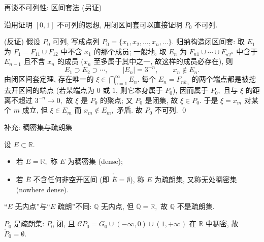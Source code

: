 \begin{frame}{再谈不可列性: 区间套法 (另证)}

沿用证明 $[0,1]$ 不可列的思想, 用\alert{闭区间套}可以直接证明 $P_0$ 不可列.

\pause

\startproof[bg=yellow, fg=red](反证)
假设 $P_0$ 可列, 写成点列 $P_0 = \{x_1, x_2, \ldots, x_n, \ldots\}.$ 归纳构造闭区间套: 取 $E_1$ 为 $F_1 = F_{11} \cup F_{12}$ 中不含 $x_1$ 的那个成员; 一般地, 取 $E_n$ 为 $F_{n1} \cup \cdots \cup F_{n2^n}$ 中含于 $E_{n-1}$ 且不含 $x_n$ 的成员 ($x_n$ 至多属于其中之一, 故这样的成员必存在), 则
\[
E_1 \supset E_2 \supset \cdots, \qquad |E_n| = 3^{-n}, \qquad x_n \notin E_n.
\]
\pause
由闭区间套定理, 存在唯一的 $\xi \in \bigcap_{n=1}^\infty E_n.$ 每个 $E_n = F_{n k_n}$ 的两个端点都是被挖去开区间的端点 (若某端点为 $0$ 或 $1$, 则它本身属于 $P_0$), 因而属于 $P_0,$ 且与 $\xi$ 的距离不超过 $3^{-n} \to 0,$ 故 $\xi$ 是 $P_0$ 的聚点; 又 $P_0$ 是闭集, 故 $\xi \in P_0.$
\pause
于是 $\xi = x_m$ 对某个 $m$ 成立, 但 $\xi \in E_m$ 而 $x_m \notin E_m,$ 矛盾. 故 $P_0$ 不可列.
\qed

\end{frame}


\graymode
\begin{frame}{补充: 稠密集与疏朗集}

\begin{Def}[稠密集与疏朗集]
设 $E \subset \mathbb{R}.$
\begin{itemize}
\item 若 $\overline{E} = \mathbb{R},$ 称 $E$ 为\alert{稠密集} (dense);
\item 若 $\overline{E}$ 不含任何非空开区间 (即 $\mathring{\overline{E}} = \emptyset$), 称 $E$ 为\alert{疏朗集}, 又称\alert{无处稠密集} (nowhere dense).
\end{itemize}
\end{Def}

\pause

\begin{attnblock}
``$E$ 无内点''与``$E$ 疏朗''不同: $\mathbb{Q}$ 无内点, 但 $\overline{\mathbb{Q}} = \mathbb{R},$ 故 $\mathbb{Q}$ 不是疏朗集.
\end{attnblock}

\pause

\begin{eg}
$P_0$ 是疏朗集: $P_0$ 闭, 且 $\mathscr{C} P_0 = G_0 \cup (-\infty, 0) \cup (1, +\infty)$ 在 $\mathbb{R}$ 中稠密, 故 $\mathring{P}_0 = \emptyset.$
\end{eg}

\end{frame}

